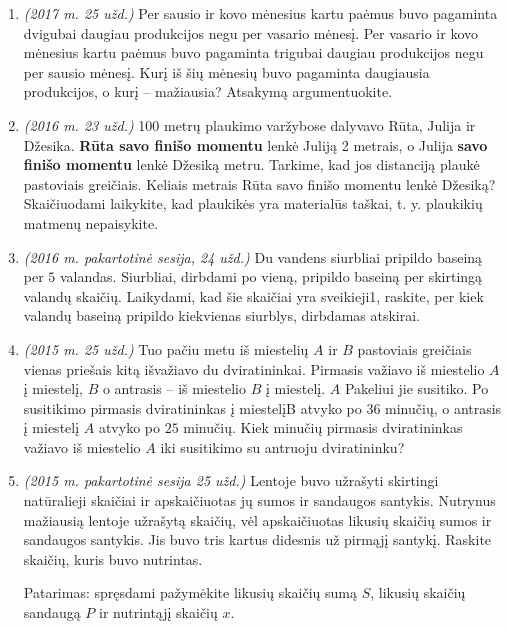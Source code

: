 \documentclass[a4paper]{article}
\begin{document}
\begin{enumerate}
      \item \textit{(2017 m. 25 užd.)} Per sausio ir kovo mėnesius kartu paėmus buvo pagaminta dvigubai daugiau produkcijos negu
            per vasario mėnesį. Per vasario ir kovo mėnesius kartu paėmus buvo pagaminta trigubai daugiau
            produkcijos negu per sausio mėnesį. Kurį iš šių mėnesių buvo pagaminta daugiausia produkcijos,
            o kurį – mažiausia? Atsakymą argumentuokite.

      \item \textit{(2016 m. 23 užd.)} 100 metrų plaukimo varžybose dalyvavo Rūta, Julija ir Džesika. \textbf{Rūta savo finišo momentu}
            lenkė Juliją 2 metrais, o Julija \textbf{savo finišo momentu} lenkė Džesiką metru. Tarkime, kad jos
            distanciją plaukė pastoviais greičiais. Keliais metrais Rūta savo finišo momentu lenkė Džesiką?
            Skaičiuodami laikykite, kad plaukikės yra materialūs taškai, t. y. plaukikių matmenų
            nepaisykite.

      \item \textit{(2016 m. pakartotinė sesija, 24 užd.)} Du vandens siurbliai pripildo baseiną per $5$ valandas. Siurbliai, dirbdami po vieną, pripildo
            baseiną per skirtingą valandų skaičių. Laikydami, kad šie skaičiai yra sveikieji1, raskite, per kiek
            valandų baseiną pripildo kiekvienas siurblys, dirbdamas atskirai.

      \item \textit{(2015 m. 25 užd.)} Tuo pačiu metu iš miestelių $A$ ir $B$ pastoviais greičiais vienas priešais kitą išvažiavo du
            dviratininkai. Pirmasis važiavo iš miestelio $A$ į miestelį, $B$ o antrasis – iš miestelio $B$ į
            miestelį. $A$ Pakeliui jie susitiko. Po susitikimo pirmasis dviratininkas į miestelįB atvyko po $36$
            minučių, o antrasis į miestelį $A$ atvyko po $25$ minučių. Kiek minučių pirmasis dviratininkas
            važiavo iš miestelio $A$ iki susitikimo su antruoju dviratininku?

      \item \textit{(2015 m. pakartotinė sesija 25 užd.)} Lentoje buvo užrašyti skirtingi natūralieji skaičiai ir apskaičiuotas jų sumos ir sandaugos
            santykis. Nutrynus mažiausią lentoje užrašytą skaičių, vėl apskaičiuotas likusių skaičių sumos ir
            sandaugos santykis. Jis buvo tris kartus didesnis už pirmąjį santykį. Raskite skaičių, kuris buvo
            nutrintas.

            Patarimas: spręsdami pažymėkite likusių skaičių sumą $S$, likusių skaičių
            sandaugą $P$ ir nutrintąjį skaičių $x$.


\end{enumerate}
\end{document}
